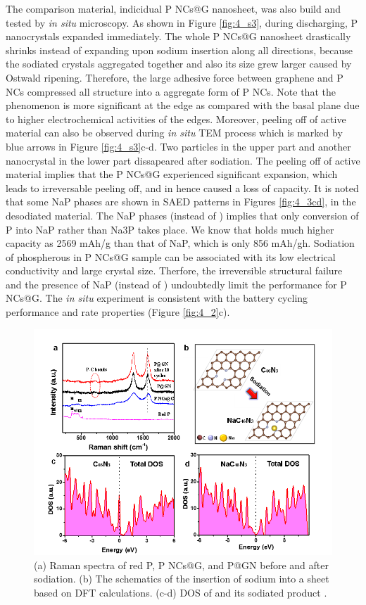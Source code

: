The comparison material, indicidual P NCs@G nanosheet, was also build and tested by {\em in situ} microscopy. 
As shown in Figure \ref{fig:4_s3}, during discharging, P nanocrystals expanded immediately. 
The whole P NCs@G nanosheet drastically shrinks instead of expanding upon sodium insertion along all directions, because the sodiated crystals aggregated together and also its size grew larger caused by Ostwald ripening.
Therefore, the large adhesive force between graphene and P NCs compressed all structure into a aggregate form of P NCs. 
Note that the phenomenon is more significant at the edge as compared with the basal plane due to higher electrochemical activities of the edges. 
Moreover, peeling off of active material can also be observed during {\em in situ} TEM process which is marked by blue arrows in Figure \ref{fig:4_s3}c-d. Two particles in the upper part and another nanocrystal in the lower part dissapeared after sodiation. 
The peeling off of active material implies that the P NCs@G experienced significant expansion, which leads to irreversable peeling off, and in hence caused a loss of capacity. 
It is noted that some NaP phases are shown in SAED patterns in Figures \ref{fig:4_3cd}, in the desodiated material. The NaP phases (instead of ) implies that only conversion of P into NaP rather than Na3P takes place. We know that  holds much higher capacity as 2569 mAh/g than that of NaP, which is only 856 mAh/gh. 
Sodiation of phospherous in P NCs@G sample can be associated with its low electrical conductivity and large crystal size. 
Therfore, the irreversible structural failure and the presence of NaP (instead of ) undoubtedly limit the performance for P NCs@G. 
The {\em in situ} experiment is consistent with the battery cycling performance and rate properties (Figure \ref{fig:4_2}c). \\

\begin{figure}  
\includegraphics[width=\textwidth]{figures/figure4_4}
\caption[Raman spectra and DFT calculations]
{
(a) Raman spectra of red P, P NCs@G, and P@GN before and after sodiation. 
(b) The schematics of the insertion of sodium into a  sheet based on DFT calculations. 
(c-d) DOS of  and its sodiated product .
\label{fig:4_4}}
\end{figure}

